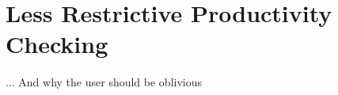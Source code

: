 \section{Less Restrictive Productivity Checking} 
\label{sec:less-restr-prod}


... And why the user should be oblivious

